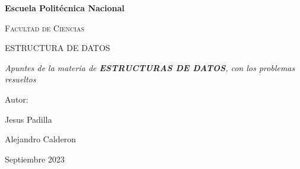 \documentclass[12pt]{article}
\begin{document}
\begin{titlepage}
\centering
{\bfseries\LARGE Escuela Politécnica Nacional \par}
\vspace{1cm}
{\scshape\Large Facultad de Ciencias \par}
\vspace{3cm}
{\scshape\Huge ESTRUCTURA DE DATOS \par}
\vspace{3cm}
{\itshape\Large Apuntes de la materia de \textbf{ESTRUCTURAS DE DATOS}, con los problemas resueltos \par}
\vfill
{\Large Autor: \par}
{\Large Jesus Padilla \par}
{\Large Alejandro Calderon \par}
\vfill
{\Large Septiembre 2023 \par}

\end{titlepage}
\tableofcontents
\newpage
\vspace{\baselineskip} %
\end{document}

